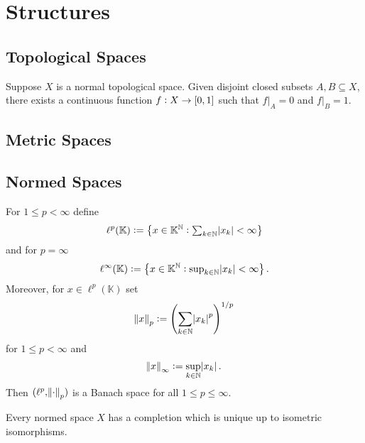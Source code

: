 \section{Structures}
\subsection{Topological Spaces}

\begin{theorem} 
	Suppose $X$ is a normal topological space. Given disjoint closed subsets $A,B \subseteq X$, there exists a continuous function $f : X \to \intcc{0,1}$ such that $f \vert_A = 0$ and $f \vert_B = 1$.
\end{theorem}

\subsection{Metric Spaces}

\subsection{Normed Spaces}

\begin{proposition}
	For $1 \leq p < \infty$ define
	\begin{equation}
		\ell^p(\mathbb{K}) := \cbr[1]{x \in \mathbb{K}^\mathbb{N} : \textstyle{\sum_{k \in \mathbb{N}}} \abs{x_k} < \infty}
	\end{equation}
	\noindent and for $p = \infty$
	\begin{equation}
		\ell^\infty(\mathbb{K}) := \cbr[1]{x \in \mathbb{K}^\mathbb{N} : \textstyle{\sup_{k \in \mathbb{N}}} \abs{x_k} < \infty}.
	\end{equation}
	Moreover, for $x \in \ell^p(\mathbb{K})$ set
	\begin{equation}
		\norm{x}_p := \del[4]{\sum_{k \in \mathbb{N}} \abs{x_k}^p}^{1/p}
	\end{equation}
	\noindent for $1 \leq p < \infty$ and
	\begin{equation}
		\norm{x}_\infty := \sup_{k \in \mathbb{N}} \abs{x_k}.
	\end{equation}
	Then $(\ell^p,\norm{\cdot}_p)$ is a Banach space for all $1 \leq p \leq \infty$.
\end{proposition}

\begin{theorem}
	Every normed space $X$ has a completion which is unique up to isometric isomorphisms.
\end{theorem}

